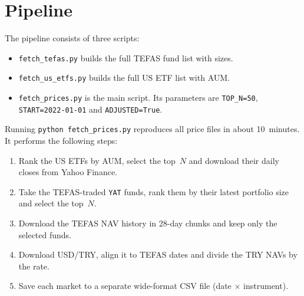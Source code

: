 \documentclass[11pt,a4paper]{article}
\newcommand{\code}[1]{\texttt{\small #1}}
\begin{document}
\section{Pipeline}
The pipeline consists of three scripts:
\begin{itemize}
  \item \code{fetch\_tefas.py} builds the full TEFAS fund list with sizes.
  \item \code{fetch\_us\_etfs.py} builds the full US ETF list with AUM.
  \item \code{fetch\_prices.py} is the main script. Its parameters are \code{TOP\_N=50},
        \code{START=2022-01-01} and \code{ADJUSTED=True}.
\end{itemize}
Running \code{python fetch\_prices.py} reproduces all price files in about 10~minutes. It
performs the following steps:
\begin{enumerate}
  \item Rank the US ETFs by AUM, select the top~$N$ and download their daily closes from
        Yahoo Finance.
  \item Take the TEFAS-traded \code{YAT} funds, rank them by their latest portfolio size
        and select the top~$N$.
  \item Download the TEFAS NAV history in 28-day chunks and keep only the selected funds.
  \item Download USD/TRY, align it to TEFAS dates and divide the TRY NAVs by the rate.
  \item Save each market to a separate wide-format CSV file (date $\times$ instrument).
\end{enumerate}
\end{document}
